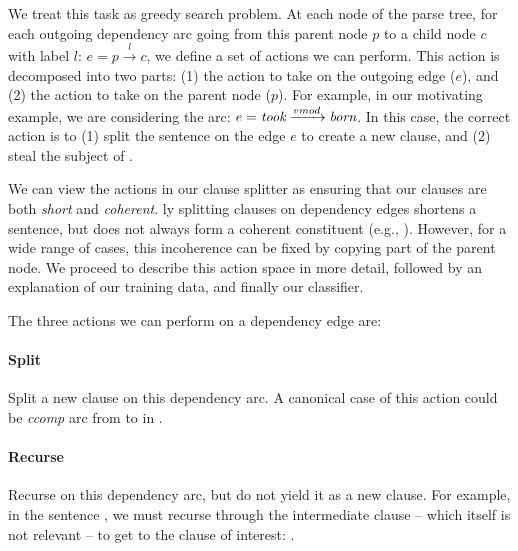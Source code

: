 We treat this task as greedy search problem.
At each node of the parse tree, for each outgoing dependency arc going
  from this parent node $p$ to a child node $c$ with label $l$:
  $e = p \xrightarrow{l} c$, we define a set of actions we can perform.
This action is decomposed into two parts: (1) the action to take on the outgoing
  edge ($e$), and (2) the action to take on the
  parent node ($p$).
For example, in our motivating example, we are considering the arc:
  $e = \textit{took} \xrightarrow{vmod} \textit{born}$.
In this case, the correct action is to
  (1) split the sentence on the edge $e$ to create a new clause,
  and (2) steal the subject of . 

We can view the actions in our clause splitter as ensuring that our
  clauses are both \textit{short} and \textit{coherent}.
\Naive ly splitting clauses on dependency edges shortens a sentence, 
   but does not
  always form a coherent constituent (e.g., ).
However, for a wide range of cases, this incoherence can be fixed by copying
  part of the parent node. 
We proceed to describe this action space in more detail, followed by an
  explanation of our training data, and finally our classifier.

%
%
The three actions we can perform on a dependency edge are:

\paragraph{Split}
  Split a new clause on this dependency arc.
  A canonical case of this action could be \textit{ccomp} arc from 
    to  in .

\paragraph{Recurse}
  Recurse on this dependency arc, but do not yield it as a new clause.
  For example, in the sentence , we must recurse through the intermediate clause
   -- which itself is not relevant
  -- to get to the clause of interest: .

